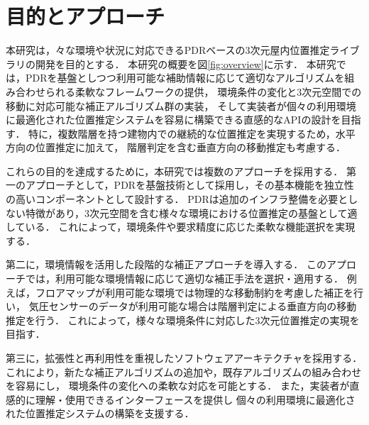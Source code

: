 

\section{目的とアプローチ}


本研究は，々な環境や状況に対応できるPDRベースの3次元屋内位置推定ライブラリの開発を目的とする．
本研究の概要を図\ref{fig:overview}に示す．
本研究では，PDRを基盤としつつ利用可能な補助情報に応じて適切なアルゴリズムを組み合わせられる柔軟なフレームワークの提供，
環境条件の変化と3次元空間での移動に対応可能な補正アルゴリズム群の実装，
そして実装者が個々の利用環境に最適化された位置推定システムを容易に構築できる直感的なAPIの設計を目指す．
特に，複数階層を持つ建物内での継続的な位置推定を実現するため，水平方向の位置推定に加えて，
階層判定を含む垂直方向の移動推定も考慮する．

これらの目的を達成するために，本研究では複数のアプローチを採用する．
第一のアプローチとして，PDRを基盤技術として採用し，その基本機能を独立性の高いコンポーネントとして設計する．
PDRは追加のインフラ整備を必要としない特徴があり，3次元空間を含む様々な環境における位置推定の基盤として適している．
これによって，環境条件や要求精度に応じた柔軟な機能選択を実現する．

第二に，環境情報を活用した段階的な補正アプローチを導入する．
このアプローチでは，利用可能な環境情報に応じて適切な補正手法を選択・適用する．
例えば，フロアマップが利用可能な環境では物理的な移動制約を考慮した補正を行い，
気圧センサーのデータが利用可能な場合は階層判定による垂直方向の移動推定を行う．
これによって，様々な環境条件に対応した3次元位置推定の実現を目指す．

第三に，拡張性と再利用性を重視したソフトウェアアーキテクチャを採用する．
これにより，新たな補正アルゴリズムの追加や，既存アルゴリズムの組み合わせを容易にし，
環境条件の変化への柔軟な対応を可能とする．
また，実装者が直感的に理解・使用できるインターフェースを提供し
個々の利用環境に最適化された位置推定システムの構築を支援する．

